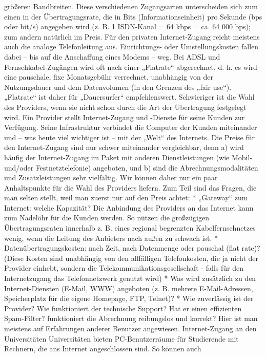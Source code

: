 \documentclass[]{book}
\theoremstyle{definition}
\theoremstyle{definition}
\theoremstyle{definition}
\theoremstyle{remark}
\begin{document}
größeren Bandbreiten. Diese verschiedenen Zugangsarten unterscheiden
sich zum einen in der Übertragungsrate, die in Bits
(Informationseinheit) pro Sekunde (bps oder bit/s) angegeben wird (z. B.
1 ISDN-Kanal = 64 kbps = ca. 64 000 bps); zum andern natürlich im Preis.
Für den privaten Internet-Zugang reicht meistens auch die analoge
Telefonleitung aus. Einrichtungs- oder Umstellungskosten fallen dabei --
bis auf die Anschaffung eines Modems -- weg. Bei ADSL und
Fernsehkabel-Zugängen wird oft nach einer „Flatrate`` abgerechnet, d. h.
es wird eine pauschale, fixe Monatsgebühr verrechnet, unabhängig von der
Nutzungsdauer und dem Datenvolumen (in den Grenzen des „fair use``).
„Flatrate`` ist daher für „Dauersurfer`` empfehlenswert. Schwieriger ist
die Wahl des Providers, wenn sie nicht schon durch die Art der
Übertragung festgelegt wird. Ein Provider stellt Internet-Zugang und
-Dienste für seine Kunden zur Verfügung. Seine Infrastruktur verbindet
die Computer der Kunden miteinander und -- was heute viel wichtiger ist
-- mit der „Welt`` des Internets. Die Preise für den Internet-Zugang
sind nur schwer miteinander vergleichbar, denn a) wird häufig der
Internet-Zugang im Paket mit anderen Dienstleistungen (wie Mobil-
und/oder Festnetztelefonie) angeboten, und b) sind die
Abrechnungsmodalitäten und Zusatzleistungen sehr vielfältig. Wir können
daher nur ein paar Anhaltspunkte für die Wahl des Providers liefern. Zum
Teil sind das Fragen, die man selten stellt, weil man zuerst nur auf den
Preis achtet: * „Gateway`` zum Internet: welche Kapazität? Die Anbindung
des Providers an das Internet kann zum Nadelöhr für die Kunden werden.
So nützen die großzügigen Übertragungsraten innerhalb z. B. eines
regional begrenzten Kabelfernsehnetzes wenig, wenn die Leitung des
Anbieters nach außen zu schwach ist. * Datenübertragungskosten: nach
Zeit, nach Datenmenge oder pauschal (flat rate)? (Diese Kosten sind
unabhängig von den allfälligen Telefonkosten, die ja nicht der Provider
einhebt, sondern die Telekommunikationsgesellschaft - falls für den
Internetzugang das Telefonnetzwerk genutzt wird) * Was wird zusätzlich
zu den Internet-Diensten (E-Mail, WWW) angeboten (z. B. mehrere
E-Mail-Adressen, Speicherplatz für die eigene Homepage, FTP, Telnet)? *
Wie zuverlässig ist der Provider? Wie funktioniert der technische
Support? Hat er einen effizienten Spam-Filter? funktioniert die
Abrechnung reibungslos und korrekt? Hier ist man meistens auf
Erfahrungen anderer Benutzer angewiesen. Internet-Zugang an den
Universitäten Universitäten bieten PC-Benutzerräume für Studierende mit
Rechnern, die ans Internet angeschlossen sind. So können auch
\end{document}
